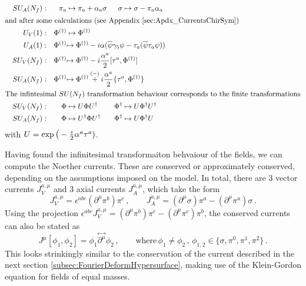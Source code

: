 \begin{subequations}
\begin{align}
         &  & SU_A(N_f): &  & \pi_a            & \mapsto\pi_a+\alpha_a\sigma                                                                 & \sigma & \mapsto\sigma-\pi_a\alpha_a &  & \\
        \intertext{and after some calculations (see Appendix \ref{sec:Apdx_CurrentsChirSym})}
         &  & U_V(1): &  & \Phi^{(\dagger)} & \mapsto \Phi^{(\dagger)}                                                              \\
         &  & U_A(1): &  & \Phi^{(\dagger)} & \mathrlap{\mapsto \Phi^{(\dagger)}-\imagu\alpha(\overline{\psi}\gamma_5\psi-\tau_a(\overline{\psi}\tau_a\psi))} &        &                                  \\
         &  & SU_V(N_f): &  & \Phi^{(\dagger)} & \mathrlap{\mapsto \Phi^{(\dagger)}-\imagu\frac{\alpha^a}{2}[\tau^a,\Phi^{(\dagger)}]}  &        &                                                            \\
         &  & SU_A(N_f): &  & \Phi^{(\dagger)} & \mathrlap{\mapsto \Phi^{(\dagger)}\overset{(-)}{+}\imagu\frac{\alpha^a}{2}\{\tau^a,\Phi^{(\dagger)}\}} &        &                                  \\
        \intertext{The infintesimal ${SU(N_f)}$ transformation behaviour corresponds to the finite transformations}
         &  & SU_V(N_f): &  & \Phi & \mapsto U\Phi U^\dagger                                                          &        \Phi^{\dagger} & \mapsto U\Phi^{\dagger}U^\dagger                                  \\
         &  & SU_A(N_f): &  & \Phi             & \mapsto U^\dagger\Phi U^\dagger&\Phi^\dagger&\mapsto U\Phi^\dagger U                 &                                              
    \end{align}
\end{subequations}
with $U=\exp\big(-\frac{{i}}{2}\alpha^a\tau^a)$.

Having found the infinitesimal transformaiton behvaiour of the fields, we can compute the Noether currents. These are conserved or approximately conserved, depending on the assumptions imposed on the model. In total, there are 3 vector currents $J_V^{a,\mu}$ and 3 axial currents $J_A^{a,\mu}$, which take the form
\begin{equation}
    J_V^{a,\mu}=\epsilon^{abc}(\partial^\mu\pi^b)\pi^c\,,\qquad J_A^{a,\mu}=(\partial^\mu\sigma)\pi^a-(\partial^\mu\pi^a)\sigma\,.
\end{equation}
Using the projection $\epsilon^{abc}J_V^{a,\mu}=(\partial^\mu\pi^b)\pi^c-(\partial^\mu\pi^c)\pi^b$, the conserved currents can also be stated as
\begin{equation}
    J^\mu[\phi_1,\phi_2]=\phi_1\overset{\leftrightarrow}{\partial^\mu}\phi_2\,,\qquad\text{where}\,\phi_{1}\neq\phi_2\,,\,\phi_{1,2}\in\{\sigma,\pi^0,\pi^1,\pi^2\}\,.
\end{equation}
This looks strinkingly similar to the conservation of the current described in the next section \eqref{subsec:FourierDeformHypersurface}, making use of the Klein-Gordon equation for fields of equal masses. 



